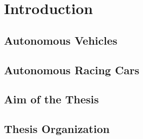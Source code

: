 \chapter*{Introduction}

\section{Autonomous Vehicles}

\section{Autonomous Racing Cars}

\section{Aim of the Thesis}

\section{Thesis Organization}